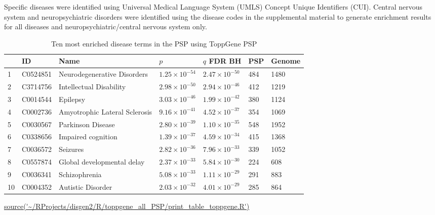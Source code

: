 Specific diseases were identified using Universal Medical Language System (UMLS) Concept Unique Identifiers (CUI)\cite{campbell1998representing}. Central nervous system and neuropsychiatric disorders were identified using the disease codes in the supplemental material to generate enrichment results for all diseases and neuropsychiatric/central nervous system only.



\begin{table}[ht]
\centering
\setlength{\extrarowheight}{2pt}
\begin{tabular}{lllllll}
  \toprule
 & ID & Name & $p$ & $q$ FDR BH & PSP & Genome \\ 
  \midrule
1 & C0524851 & Neurodegenerative Disorders & $1.25 \times 10^{-54}$ & $2.47 \times 10^{-50}$ & 484 & 1480 \\ 
  2 & C3714756 & Intellectual Disability & $2.98 \times 10^{-50}$ & $2.94 \times 10^{-46}$ & 412 & 1219 \\ 
  3 & C0014544 & Epilepsy & $3.03 \times 10^{-46}$ & $1.99 \times 10^{-42}$ & 380 & 1124 \\ 
  4 & C0002736 & Amyotrophic Lateral Sclerosis & $9.16 \times 10^{-41}$ & $4.52 \times 10^{-37}$ & 354 & 1069 \\ 
  5 & C0030567 & Parkinson Disease & $2.80 \times 10^{-39}$ & $1.10 \times 10^{-35}$ & 548 & 1952 \\ 
  6 & C0338656 & Impaired cognition & $1.39 \times 10^{-37}$ & $4.59 \times 10^{-34}$ & 415 & 1368 \\ 
  7 & C0036572 & Seizures & $2.82 \times 10^{-36}$ & $7.96 \times 10^{-33}$ & 339 & 1052 \\ 
  8 & C0557874 & Global developmental delay & $2.37 \times 10^{-33}$ & $5.84 \times 10^{-30}$ & 224 & 608 \\ 
  9 & C0036341 & Schizophrenia & $5.08 \times 10^{-33}$ & $1.11 \times 10^{-29}$ & 291 & 883 \\ 
  10 & C0004352 & Autistic Disorder & $2.03 \times 10^{-32}$ & $4.01 \times 10^{-29}$ & 285 & 864 \\ 
   \bottomrule
\end{tabular}
\caption[Ten most enriched disease terms in the post synaptic proteome (PSP)]{Ten most enriched disease terms in the PSP using ToppGene PSP}
\tiny\url{source('~/RProjects/disgen2/R/toppgene_all_PSP/print_table_toppgene.R')}
\label{tab:disgen_toppgene}
\end{table}

